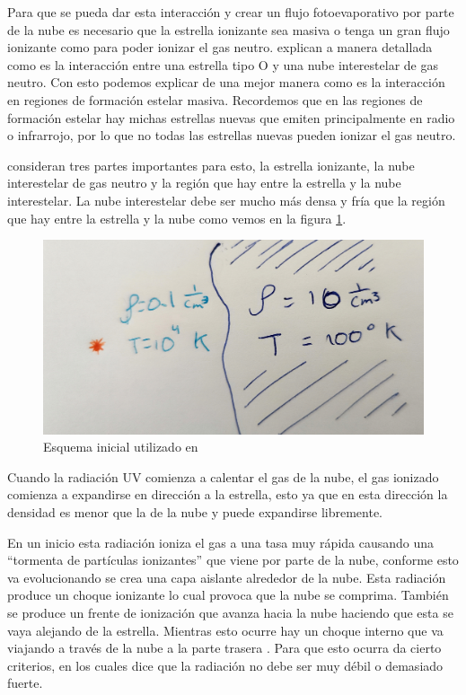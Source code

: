 \documentclass{book}
\begin{document}
Para que se pueda dar esta interacción y crear un flujo fotoevaporativo por parte de la nube es necesario que la estrella ionizante sea masiva o tenga un gran flujo ionizante como para poder ionizar el gas neutro. \cite{OortySpitzer_1955} explican a manera detallada como es la interacción entre una estrella tipo O y una nube interestelar de gas neutro. Con esto podemos explicar de una mejor manera como es la interacción en regiones de formación estelar masiva. Recordemos que en las regiones de formación estelar hay michas estrellas nuevas que emiten principalmente en radio o infrarrojo, por lo que no todas las estrellas nuevas pueden ionizar el gas neutro.

\cite{OortySpitzer_1955} consideran tres partes importantes para esto, la estrella ionizante, la nube interestelar de gas neutro y la región que hay entre la estrella y la nube interestelar. La nube interestelar debe ser mucho más densa y fría que la región que hay entre la estrella y la nube como vemos en la figura \ref{kahn_zones}.

\begin{figure}[h]
    \centering
    \includegraphics[width=0.5 \textwidth]{images Chapter 1/C1_Kahn.jpg}
    \caption{Esquema inicial utilizado en \cite{Kahn:1954}}
    \label{kahn_zones}
\end{figure}

Cuando la radiación UV comienza a calentar el gas de la nube, el gas ionizado comienza a expandirse en dirección a la estrella, esto ya que en esta dirección la densidad es menor que la de la nube y puede expandirse libremente. 

En un inicio esta radiación ioniza el gas a una tasa muy rápida causando una ``tormenta de partículas ionizantes'' que viene por parte de la nube, conforme esto va evolucionando se crea una capa aislante alrededor de la nube. Esta radiación produce un choque ionizante lo cual provoca que la nube se comprima. También se produce un frente de ionización que avanza hacia la nube haciendo que esta se vaya alejando de la estrella. Mientras esto ocurre hay un choque interno que va viajando a través de la nube a la parte trasera \citep{Bertoldi_1989}. Para que esto ocurra \cite{Kahn:1954} da cierto criterios, en los cuales dice que la radiación no debe ser muy débil o demasiado fuerte.
\end{document}
